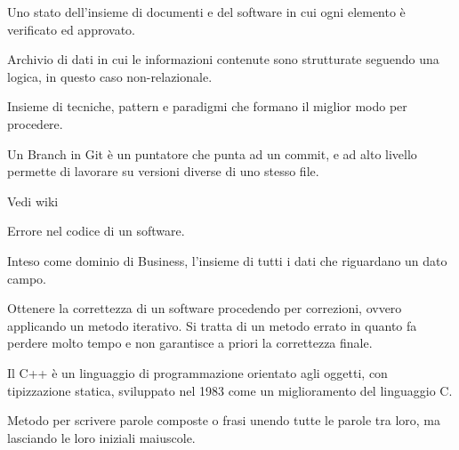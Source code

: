 
Uno stato dell'insieme di documenti e del software in cui ogni elemento è verificato ed approvato. \\


Archivio di dati in cui le informazioni contenute sono strutturate seguendo una logica, in questo caso non-relazionale. \\ 


Insieme di tecniche, pattern e paradigmi che formano il miglior modo per procedere. \\


Un Branch in Git è un puntatore che punta ad un commit, e ad alto livello permette di lavorare su versioni diverse di uno stesso file. \\


Vedi wiki


Errore nel codice di un software. \\


Inteso come dominio di Business, l'insieme di tutti i dati che riguardano un dato campo. \\


Ottenere la correttezza di un software procedendo per correzioni, ovvero applicando un metodo iterativo. Si tratta di un metodo errato in quanto fa perdere molto tempo e non garantisce a priori la correttezza finale. \\



Il C++ è un linguaggio di programmazione orientato agli oggetti, con tipizzazione statica, sviluppato nel 1983 come un miglioramento del linguaggio C. \\





Metodo per scrivere parole composte o frasi unendo tutte le parole tra loro, ma lasciando le loro iniziali maiuscole. \\

